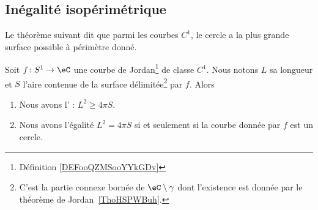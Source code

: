 \subsection{Inégalité isopérimétrique}

Le théorème suivant dit que parmi les courbes \( C^1\), le cercle a la plus grande surface possible à périmètre donné.
\begin{theorem}    \label{ThoIXyctPo}
	Soit \( f\colon S^1\to \eC \) une courbe de Jordan\footnote{Définition \ref{DEFooQZMSooYYkGDv}} de classe \( C^1\). Nous notons \( L\) sa longueur et \( S\) l'aire contenue de la surface délimitée\footnote{C'est la partie connexe bornée de \( \eC\setminus\gamma\) dont l'existence est donnée par le théorème de Jordan~\ref{ThoHSPWBuh}.} par \( f\). Alors
	\begin{enumerate}
		\item
		      Nous avons l' : \( L^2\geq 4\pi S\).
		\item
		      Nous avons l'égalité \( L^2=4\pi S\) si et seulement si la courbe donnée par \( f\) est un cercle.
	\end{enumerate}
\end{theorem}

